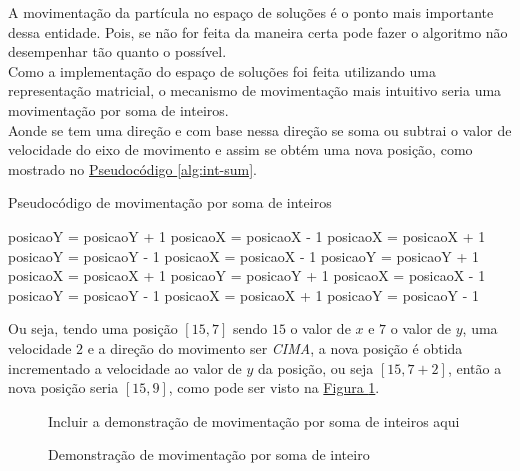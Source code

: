 %
\indent A movimentação da partícula no espaço de soluções é o ponto mais importante dessa entidade. Pois, se não for feita da maneira certa pode fazer o algoritmo não desempenhar tão quanto o possível.\\
\indent Como a implementação do espaço de soluções foi feita utilizando uma representação matricial, o mecanismo de movimentação mais intuitivo seria uma movimentação por soma de inteiros.\\
\indent Aonde se tem uma direção e com base nessa direção se soma ou subtrai o valor de velocidade do eixo de movimento e assim se obtém uma nova posição, como mostrado no \hyperref[alg:int-sum]{Pseudocódigo \ref{alg:int-sum}}.
\begin{algorithm}
    \caption{Pseudocódigo de movimentação por soma de inteiros}\label{alg:int-sum}
\begin{algorithmic}
  \State posicaoY = posicaoY + 1
  \State posicaoX = posicaoX - 1
  \State posicaoX = posicaoX + 1
  \State posicaoY = posicaoY - 1
  \State posicaoX = posicaoX - 1
  \State posicaoY = posicaoY + 1
  \State posicaoX = posicaoX + 1
  \State posicaoY = posicaoY + 1
  \State posicaoX = posicaoX - 1
  \State posicaoY = posicaoY - 1
  \State posicaoX = posicaoX + 1
  \State posicaoY = posicaoY - 1
\EndIf    

\end{algorithmic}
\end{algorithm}

Ou seja, tendo uma posição $[15, 7]$ sendo $15$ o valor de $x$ e $7$ o valor de $y$,
uma velocidade $2$ e a direção do movimento ser \textit{CIMA}, a nova posição é obtida incrementado a velocidade ao valor de $y$ da posição, ou seja $[15, 7+2]$, então a nova posição seria $[15, 9]$, como pode ser visto na 
\hyperref[fig:movimentacao-int-sum]{Figura \ref{fig:movimentacao-int-sum}}.\hfill

\begin{figure}[ht]
\centering
\small{Incluir a demonstração de movimentação por soma de inteiros aqui}
\caption{Demonstração de movimentação por soma de inteiro}
\label{fig:movimentacao-int-sum}
\end{figure}

